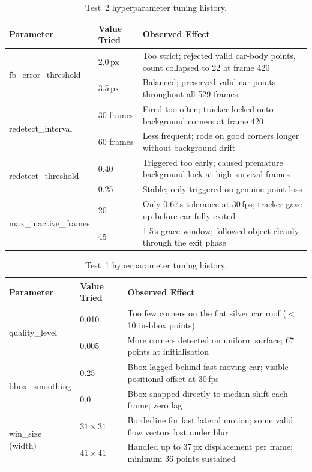 \documentclass[12pt,a4paper]{article}
\begin{document}
\begin{table}[H]
\centering\small
\caption{Test~2 hyperparameter tuning history.}
\label{tab:hyper2}
\begin{tabularx}{\textwidth}{llX}
\toprule
\rowcolor{accentteal!20}
\textbf{Parameter} & \textbf{Value Tried} & \textbf{Observed Effect} \\
\midrule
\multirow{2}{*}{fb\_error\_threshold}
 & 2.0\,px & Too strict; rejected valid car-body points, count collapsed to 22 at frame 420 \\
 & 3.5\,px & Balanced; preserved valid car points throughout all 529 frames \\
\midrule
\multirow{2}{*}{redetect\_interval}
 & 30 frames & Fired too often; tracker locked onto background corners at frame 420 \\
 & 60 frames & Less frequent; rode on good corners longer without background drift \\
\midrule
\multirow{2}{*}{redetect\_threshold}
 & 0.40 & Triggered too early; caused premature background lock at high-survival frames \\
 & 0.25 & Stable; only triggered on genuine point loss \\
\midrule
\multirow{2}{*}{max\_inactive\_frames}
 & 20 & Only 0.67\,s tolerance at 30\,fps; tracker gave up before car fully exited \\
 & 45 & 1.5\,s grace window; followed object cleanly through the exit phase \\
\bottomrule
\end{tabularx}
\end{table}

\begin{table}[H]
\centering\small
\caption{Test~1 hyperparameter tuning history.}
\label{tab:hyper1}
\begin{tabularx}{\textwidth}{llX}
\toprule
\rowcolor{accentteal!20}
\textbf{Parameter} & \textbf{Value Tried} & \textbf{Observed Effect} \\
\midrule
\multirow{2}{*}{quality\_level}
 & 0.010 & Too few corners on the flat silver car roof ($<$10 in-bbox points) \\
 & 0.005 & More corners detected on uniform surface; 67 points at initialisation \\
\midrule
\multirow{2}{*}{bbox\_smoothing}
 & 0.25 & Bbox lagged behind fast-moving car; visible positional offset at 30\,fps \\
 & 0.0 & Bbox snapped directly to median shift each frame; zero lag \\
\midrule
\multirow{2}{*}{win\_size (width)}
 & $31\times31$ & Borderline for fast lateral motion; some valid flow vectors lost under blur \\
 & $41\times41$ & Handled up to 37\,px displacement per frame; minimum 36 points sustained \\
\bottomrule
\end{tabularx}
\end{table}
\end{document}
